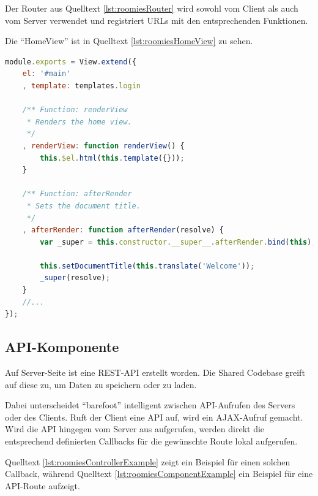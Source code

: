 Der Router aus Quelltext \ref{lst:roomiesRouter} wird sowohl vom Client als auch vom Server verwendet und registriert URLs mit den entsprechenden Funktionen.

Die ``HomeView'' ist in Quelltext \ref{lst:roomiesHomeView} zu sehen.

\begin{lstlisting}[language=JavaScript, caption=Ausschnitt aus HomeView der Beispielapplikation \cite{roomiesHomeView}, label=lst:roomiesHomeView, firstnumber=7]
module.exports = View.extend({
	el: '#main'
	, template: templates.login

	/** Function: renderView
	 * Renders the home view.
	 */
	, renderView: function renderView() {
		this.$el.html(this.template({}));
	}

	/** Function: afterRender
	 * Sets the document title.
	 */
	, afterRender: function afterRender(resolve) {
		var _super = this.constructor.__super__.afterRender.bind(this);

		this.setDocumentTitle(this.translate('Welcome'));
		_super(resolve);
	}
	//...
});
\end{lstlisting}

\subsection{API-Komponente}
Auf Server-Seite ist eine REST-API \cite{REST} erstellt worden. Die Shared Codebase greift auf diese zu, um Daten zu speichern oder zu laden.

Dabei unterscheidet ``barefoot'' intelligent zwischen API-Aufrufen des Servers oder des Clients.
Ruft der Client eine API auf, wird ein AJAX-Aufruf gemacht. Wird die API
hingegen vom Server aus aufgerufen, werden direkt die entsprechend definierten
Callbacks für die gewünschte Route lokal aufgerufen.

Quelltext \ref{lst:roomiesControllerExample} zeigt ein Beispiel für einen solchen
Callback, während Quelltext \ref{lst:roomiesComponentExample} ein Beispiel für
eine API-Route aufzeigt.

